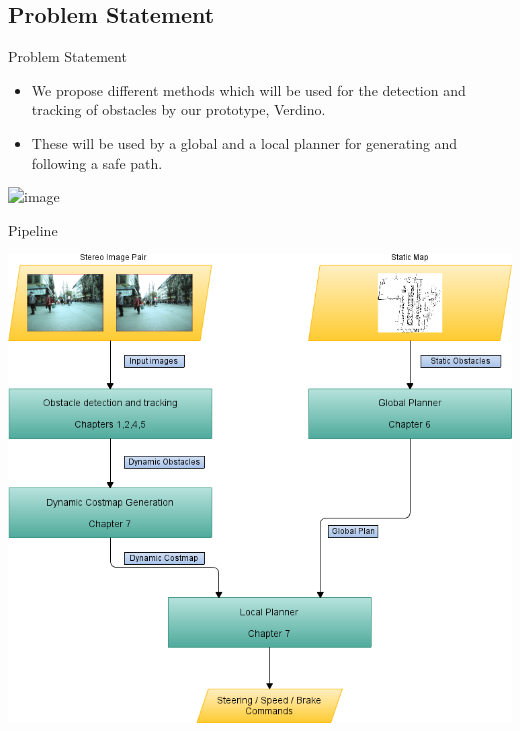   \subsection{Problem Statement}
  \begin{frame}{Problem Statement}
    \begin{itemize}
     \item<1-> We propose different methods which will be used for the detection and tracking of obstacles by our prototype, Verdino.
     \item<2-> These will be used by a global and a local planner for generating and following a safe path.
    \end{itemize}
    \begin{center}
      \includegraphics<1->[height=.35\columnwidth]{verdino}
    \end{center}
  \end{frame}
  
  \begin{frame}[plain]{Pipeline}
    \begin{center}
      \includegraphics[height=1.1\textheight]{pipeline_cp0}
    \end{center}
    
  \end{frame}

